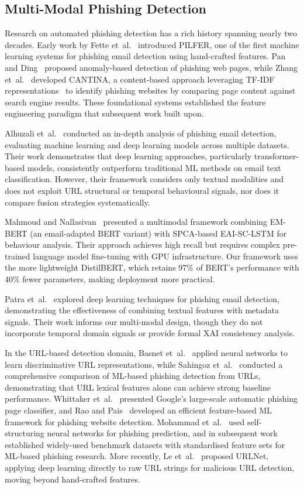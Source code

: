 \documentclass[conference]{IEEEtran}
\begin{document}
\subsection{Multi-Modal Phishing Detection}

Research on automated phishing detection has a rich history spanning nearly two decades. Early work by Fette et~al.~\cite{fette2007} introduced PILFER, one of the first machine learning systems for phishing email detection using hand-crafted features. Pan and Ding~\cite{pan2006} proposed anomaly-based detection of phishing web pages, while Zhang et~al.~\cite{zhang2007} developed CANTINA, a content-based approach leveraging TF-IDF representations~\cite{salton1988} to identify phishing websites by comparing page content against search engine results. These foundational systems established the feature engineering paradigm that subsequent work built upon.

Alhuzali et~al.~\cite{alhuzali2025} conducted an in-depth analysis of
phishing email detection, evaluating machine learning and deep learning
models across multiple datasets. Their work demonstrates that deep learning
approaches, particularly transformer-based models, consistently outperform
traditional ML methods on email text classification. However, their
framework considers only textual modalities and does not exploit URL
structural or temporal behavioural signals, nor does it compare fusion
strategies systematically.

Mahmoud and Nallasivan~\cite{mahmoud2025} presented a multimodal framework
combining EM-BERT (an email-adapted BERT variant) with SPCA-based EAI-SC-LSTM
for behaviour analysis. Their approach achieves high recall but requires
complex pre-trained language model fine-tuning with GPU infrastructure. Our
framework uses the more lightweight DistilBERT, which retains 97\% of BERT's
performance with 40\% fewer parameters, making deployment more practical.

Patra et~al.~\cite{patra2025} explored deep learning techniques for phishing
email detection, demonstrating the effectiveness of combining textual features
with metadata signals. Their work informs our multi-modal design, though they
do not incorporate temporal domain signals or provide formal XAI consistency
analysis.

In the URL-based detection domain, Basnet et~al.~\cite{basnet2012} applied neural networks to learn discriminative URL representations, while Sahingoz et~al.~\cite{sahingoz2019} conducted a comprehensive comparison of ML-based phishing detection from URLs, demonstrating that URL lexical features alone can achieve strong baseline performance. Whittaker et~al.~\cite{whittaker2010} presented Google's large-scale automatic phishing page classifier, and Rao and Pais~\cite{raopais2019} developed an efficient feature-based ML framework for phishing website detection. Mohammad et~al.~\cite{mohammad2014} used self-structuring neural networks for phishing prediction, and in subsequent work~\cite{mohammad2015} established widely-used benchmark datasets with standardised feature sets for ML-based phishing research. More recently, Le et~al.~\cite{le2018} proposed URLNet, applying deep learning directly to raw URL strings for malicious URL detection, moving beyond hand-crafted features.
\end{document}
